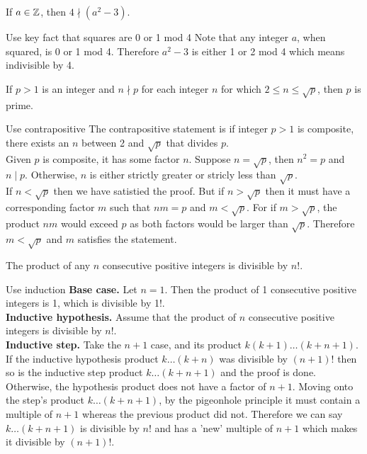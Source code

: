 \documentclass{article}
\begin{document}
\begin{problem}
If $a \in \mathbb{Z}$, then $4 \nmid (a^2 - 3)$.
\end{problem}
\begin{solution}{Use key fact that squares are 0 or 1 mod 4}
  Note that any integer $a$, when squared, is 0 or 1 mod 4. Therefore $a^2 - 3$ is either 1 or 2 mod 4 which means indivisible by 4.
\end{solution}

\begin{problem}
If $p > 1$ is an integer and $n \nmid p$ for each integer $n$ for which $2 \leq n \leq \sqrt{p}$, then $p$ is prime.
\end{problem}
\begin{solution}{Use contrapositive}
  The contrapositive statement is if integer $p > 1$ is composite, there exists an $n$ between 2 and $\sqrt{p}$ that divides $p$.
  \\

  Given $p$ is composite, it has some factor $n$. Suppose $n = \sqrt{p}$, then $n^2 = p$ and $n \mid p$. Otherwise, $n$ is either strictly greater or stricly less than $\sqrt{p}$.
  \\

  If $n < \sqrt{p}$ then we have satistied the proof. But if $n > \sqrt{p}$ then it must have a corresponding factor $m$ such that $nm = p$ and $m < \sqrt{p}$. For if $m > \sqrt{p}$, the product $nm$ would exceed $p$ as both factors would be larger than $\sqrt{p}$. Therefore $m < \sqrt{p}$ and $m$ satisfies the statement.
\end{solution}

\begin{problem}
The product of any $n$ consecutive positive integers is divisible by $n!$.
\end{problem}
\begin{solution}{Use induction}
  \textbf{Base case.} Let $n = 1$. Then the product of 1 consecutive positive integers is 1, which is divisible by 1!.
  \\

  \textbf{Inductive hypothesis.} Assume that the product of $n$ consecutive positive integers is divisible by $n!$.
  \\

  \textbf{Inductive step.} Take the $n+1$ case, and its product $k(k+1)\ldots(k+n+1)$. If the inductive hypothesis product $k\ldots(k+n)$ was divisible by $(n+1)!$ then so is the inductive step product $k\ldots(k+n+1)$ and the proof is done. Otherwise, the hypothesis product does not have a factor of $n+1$. Moving onto the step's product $k\ldots(k+n+1)$, by the pigeonhole principle it must contain a multiple of $n+1$ whereas the previous product did not. Therefore we can say $k\ldots(k+n+1)$ is divisible by $n!$ and has a 'new' multiple of $n+1$ which makes it divisible by $(n+1)!$.
\end{solution}
\end{document}
